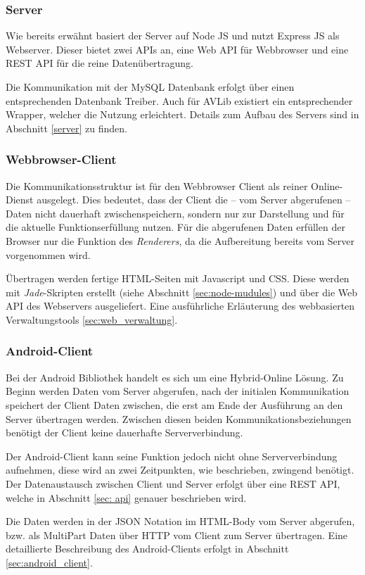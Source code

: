 \subsubsection{Server}
Wie bereits erwähnt basiert der Server auf Node JS und nutzt Express JS als Webserver.
Dieser bietet zwei \ac{API}s an, eine Web API für Webbrowser und eine REST API für die reine Datenübertragung.

Die Kommunikation mit der MySQL Datenbank erfolgt über einen entsprechenden Datenbank Treiber.
Auch für AVLib existiert ein entsprechender Wrapper, welcher die Nutzung erleichtert.
Details zum Aufbau des Servers sind in Abschnitt \ref{server} zu finden.


\subsubsection{Webbrowser-Client}
Die Kommunikationsstruktur ist für den Webbrowser Client als reiner Online-Dienst ausgelegt.
Dies bedeutet, dass der Client die -- vom Server abgerufenen -- Daten nicht dauerhaft zwischenspeichern, sondern nur zur Darstellung und für die aktuelle Funktionserfüllung nutzen.
Für die abgerufenen Daten erfüllen der Browser nur die Funktion des \emph{Renderers}, da die Aufbereitung bereits vom Server vorgenommen wird.

Übertragen werden fertige HTML-Seiten mit Javascript und \ac{CSS}.
Diese werden mit \emph{Jade}-Skripten erstellt (siehe Abschnitt \ref{sec:node-mudules}) und über die Web API des Webservers ausgeliefert.
Eine ausführliche Erläuterung des webbasierten Verwaltungstools \ref{sec:web_verwaltung}.


\subsubsection{Android-Client}
Bei der Android Bibliothek handelt es sich um eine Hybrid-Online Lösung.
Zu Beginn werden Daten vom Server abgerufen, nach der initialen Kommunikation speichert der Client Daten zwischen, die erst am Ende der Ausführung an den Server übertragen werden.
Zwischen diesen beiden Kommunikationsbeziehungen benötigt der Client keine dauerhafte Serververbindung.

Der Android-Client kann seine Funktion jedoch nicht ohne Serververbindung aufnehmen, diese wird an zwei Zeitpunkten, wie beschrieben, zwingend benötigt.
Der Datenaustausch zwischen Client und Server erfolgt über eine REST API, welche in Abschnitt \ref{sec: api} genauer beschrieben wird.

Die Daten werden in der \ac{JSON} Notation im HTML-Body vom Server abgerufen, bzw. als MultiPart Daten über HTTP vom Client zum Server übertragen.
Eine detaillierte Beschreibung des Android-Clients erfolgt in Abschnitt \ref{sec:android_client}.
